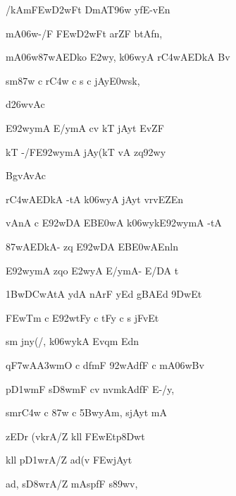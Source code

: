 {\dn {}/kAm\3FEw\3D2wFt DmA\0T\0\396w yfE-vEn{\dandabdn} \dontdisplaylinenum}

{\dn {}mA\306w-/F\2 \3FEw\3D2wFt arZF btAfn, \vegdn\dontdisplaylinenum}

{\dn {}mA\306w\387wAEDko \3E2w\?y, k\306wyA r\3C4wAEDkA Bv\? \dontdisplaylinenum}

{\dn sm\387w\? c r\3C4w\? c s c jAy\?\3E0w\2sk, \vegdn\dontdisplaylinenum}



{\dn d\?\326wvAc{\dandabdn}\dontdisplaylinenum }

{\dn E\392wymA E/ymA c\4v kT\2 jAy\?t Ev\0ZF{\dandadn} \dontdisplaylinenum}

{\dn kT\2 -/FE\392wymA jAy\?(kT\2 vA zq\392wy \vegdn\dontdisplaylinenum}

{\dn BgvAvAc{\dandabdn}\dontdisplaylinenum }

{\dn r\3C4wAEDkA -tA k\306wyA jAyt\? vrvEZ\0En{\dandadn} \dontdisplaylinenum}

{\dn vAnA c E\392wDA EB\3E0wA k\306wykE\392wymA -tA \vegdn\dontdisplaylinenum}

{\dn {}\387wAEDkA- zq E\392wDA EB\3E0wAEnl\?n  \dontdisplaylinenum}

{\dn E\392wymA zqo \3E2w\?yA E/ymA- E/DA t\? \vegdn\dontdisplaylinenum}

{\dn \31Bw\3DCwAtA ydA nArF yEd gBA\0Ed \39DwEt{\dandabdn} \dontdisplaylinenum}

{\dn \3FEwTm\? c E\392wtFy\? c tFy\? c s jFvEt \vegdn\dontdisplaylinenum}

{\dn sm\? jny\?(/, k\306wykA Evqm\? Edn\?{\dandabdn} \dontdisplaylinenum}

{\dn q\3F7wA\3A3wmO c dfmF \392wAdfF c mA\306wBv\? \vegdn\dontdisplaylinenum}

{\dn p\3D1wmF s\3D8wmF c\4v nvm\?kAdfF E-/y,{\dandabdn} \dontdisplaylinenum}

{\dn smr\3C4w\? c \387w\? c \35BwyAm, s\2jAyt\? mA \vegdn\dontdisplaylinenum}

{\dn zEDr\2 (v\?krA/\?Z kll\2 \3FEwEtp\38Dwt\?{\dandabdn} \dontdisplaylinenum}

{\dn kll\2 p\3D1wrA/\?Z a\0d(v\2 \3FEwjAyt\? \vegdn\dontdisplaylinenum}

{\dn a\0d, s\3D8wrA/\?Z mA\2sp\?fF s\389wv,{\dandabdn} \dontdisplaylinenum}

